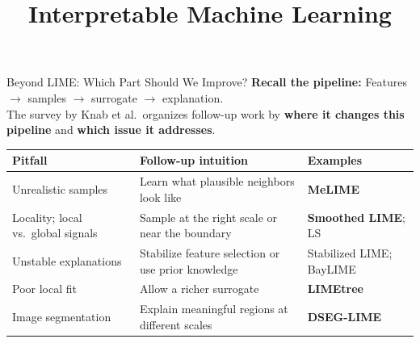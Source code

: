 \documentclass[10pt,compress,t,notes=noshow,xcolor=table]{beamer}
\title{Interpretable Machine Learning}
\begin{document}


\begin{framev}[align=top]{Beyond LIME: Which Part Should We Improve?}
\textbf{Recall the pipeline:}
Features $\rightarrow$ samples $\rightarrow$ surrogate $\rightarrow$ explanation.\\
\spacer[0.25]
The survey by Knab et al.\ organizes follow-up work by \textbf{where it changes this pipeline} and \textbf{which issue it addresses}. 
\begin{center}
\renewcommand{\arraystretch}{1.45}
\begin{tabular}{@{}>{\raggedright\arraybackslash}p{} >{\raggedright\arraybackslash}p{} >{\raggedright\arraybackslash}p{}@{}}
\toprule
\textbf{Pitfall} & \textbf{Follow-up intuition} & \textbf{Examples} \\
\midrule
Unrealistic samples & Learn what plausible neighbors look like & \textcolor{limeBlue}{\textbf{MeLIME}} \\
Locality; local vs.\ global signals & Sample at the right scale or near the boundary & \textcolor{limeTeal}{\textbf{Smoothed LIME}; LS} \\
Unstable explanations & Stabilize feature selection or use prior knowledge & \textcolor{limeBlue}{Stabilized LIME; BayLIME} \\
Poor local fit & Allow a richer surrogate & \textcolor{limeTeal}{\textbf{LIMEtree}} \\
Image segmentation & Explain meaningful regions at different scales & \textcolor{limeBlue}{\textbf{DSEG-LIME}} \\
\bottomrule
\end{tabular}
\end{center}
\end{framev}
\end{document}
